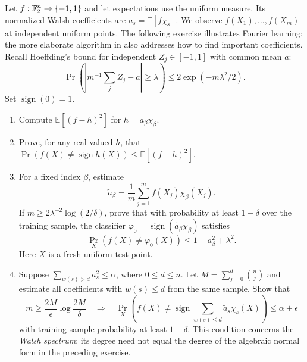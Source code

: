 
\begin{exo}
\label{exo-learning-boolean-functions}
Let $f:\mathbb{F}_2^n\to\{-1,1\}$ and let expectations use the uniform measure.
Its normalized Walsh coefficients are $a_s=\mathbb E[f\chi_s]$. We observe
$f(X_1),\ldots,f(X_m)$ at independent uniform points. The following
exercise illustrates Fourier learning; the more elaborate algorithm in
\cite{kushilevitz-learning-decision-tree} also addresses how to find
important coefficients. Recall Hoeffding's bound for independent
$Z_j\in[-1,1]$ with common mean $a$:
\[
 \Pr\!\left(\left|m^{-1}\sum_j Z_j-a\right|\geq\lambda\right)
 \leq2\exp(-m\lambda^2/2).
\]
Set $\operatorname{sign}(0)=1$.
\begin{enumerate}
\item Compute $\mathbb E[(f-h)^2]$ for $h=a_\beta\chi_\beta$.
\item Prove, for any real-valued $h$, that
$\Pr(f(X)\ne\operatorname{sign}h(X))\leq\mathbb E[(f-h)^2]$.
\item For a fixed index $\beta$, estimate
\begin{equation}
\label{eq-calcul-approach-coef-walsh}
 \widetilde a_\beta=\frac1m\sum_{j=1}^m f(X_j)\chi_\beta(X_j).
\end{equation}
If $m\geq2\lambda^{-2}\log(2/\delta)$, prove that with probability at
least $1-\delta$ over the training sample, the classifier
$\varphi_0=\operatorname{sign}(\widetilde a_\beta\chi_\beta)$ satisfies
\[
 \Pr_X(f(X)\ne\varphi_0(X))\leq1-a_\beta^2+\lambda^2.
\]
Here $X$ is a fresh uniform test point.
\item Suppose $\sum_{w(s)>d}a_s^2\leq\alpha$, where $0\leq d\leq n$.
Let $M=\sum_{j=0}^d\binom nj$ and estimate all coefficients with
$w(s)\leq d$ from the same sample. Show that
\[
 m\geq\frac{2M}{\epsilon}\log\frac{2M}{\delta}
 \quad\Longrightarrow\quad
 \Pr_X\!\left(f(X)\ne\operatorname{sign}
       \sum_{w(s)\leq d}\widetilde a_s\chi_s(X)\right)\leq\alpha+\epsilon
\]
with training-sample probability at least $1-\delta$.
This condition concerns the \emph{Walsh spectrum}; its degree need not
equal the degree of the algebraic normal form in the preceding exercise.
\end{enumerate}
\end{exo}


